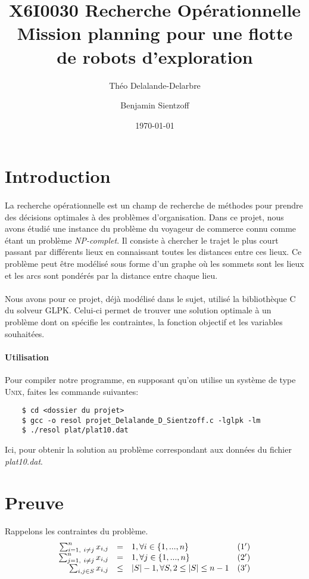 \documentclass[a4paper,12pt]{article}
\title{\textsc{X6I0030} Recherche Opérationnelle \\ Mission planning pour une flotte de robots d’exploration}
\author{Théo Delalande-Delarbre \and Benjamin Sientzoff}
\date{\today}
\begin{document}
\maketitle

\section*{Introduction}

\paragraph{}{
    La recherche opérationnelle est un champ de recherche de méthodes pour prendre des décisions optimales à des problèmes d'organisation. Dans ce projet, nous avons étudié une instance du problème du voyageur de commerce connu comme étant un problème \textit{NP-complet}. Il consiste à chercher le trajet le plus court passant par différents lieux en connaissant toutes les distances entre ces lieux. Ce problème peut être modélisé sous forme d'un graphe où les sommets sont les lieux et les arcs sont pondérés par la distance entre chaque lieu. }
\paragraph{}{
	Nous avons pour ce projet, déjà modélisé dans le sujet, utilisé la bibliothèque C du solveur GLPK. Celui-ci permet de trouver une solution optimale à un problème dont on spécifie les contraintes, la fonction objectif et les variables souhaitées.
}

\paragraph{Utilisation}{
    Pour compiler notre programme, en supposant qu'on utilise un système de type \textsc{Unix}, faites les commande suivantes:
    \begin{verbatim}
    $ cd <dossier du projet>
    $ gcc -o resol projet_Delalande_D_Sientzoff.c -lglpk -lm
    $ ./resol plat/plat10.dat
    \end{verbatim}
    Ici, pour obtenir la solution au problème correspondant aux données du fichier \textit{plat10.dat}.
}

\section{Preuve} %

\paragraph{}{
    Rappelons les contraintes du problème.
}
\[
\begin{array}{r c l l}
  \sum_{i=1,\ i\neq j}^{n} x_{i,j} & =  & 1 , \forall i \in \{1,...,n\} & (1') \\
  \sum_{j=1,\ i\neq j}^{n} x_{i,j} & = & 1 , \forall j \in \{1,...,n\} & (2') \\
  \sum_{i,j \in S} x_{i,j} & \leq & |S| - 1 , \forall S, 2 \leq |S| \leq n - 1 & (3') \\
\end{array}
\]
\end{document}
